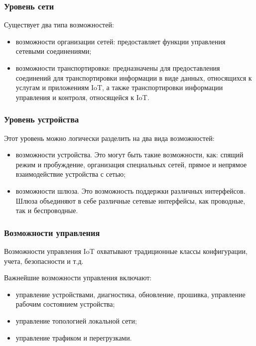 
\subsubsection{Уровень сети}

Существует два типа возможностей:

\begin{itemize}
	\item возможности организации сетей: предоставляет функции управления сетевыми соединениями;
	\item возможности транспортировки: предназначены для предоставления соединений для транспортировки информации в виде данных, относящихся к услугам и приложениям IoT, а также транспортировки информации управления и контроля, относящейся к IoT.
\end{itemize}


\subsubsection{Уровень устройства}

Этот уровень можно логически разделить на два вида возможностей:
\begin{itemize}
	\item возможности устройства. Это могут быть такие возможности, как: спящий режим и пробуждение, организация специальных сетей, прямое и непрямое взаимодействие устройства с сетью;
	\item возможности шлюза. Это возможность поддержки различных интерфейсов. Шлюза объединяют в себе различные сетевые интерфейсы, как проводные, так и беспроводные.
\end{itemize}


\subsubsection{Возможности управления}

Возможности управления IoT охватывают традиционные классы конфигурации, учета, безопасности и т.д.

Важнейшие возможности управления включают:
\begin{itemize}
	\item управление устройствами, диагностика, обновление, прошивка, управление рабочим состоянием устройства;
	\item управление топологией локальной сети;
	\item управление трафиком и перегрузками.
\end{itemize}

